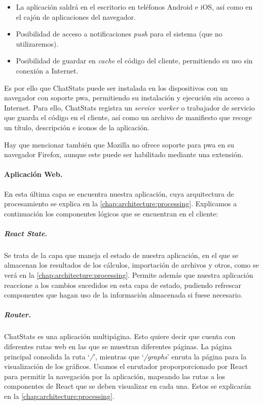 \begin{itemize}
	\item La aplicación saldrá en el escritorio en teléfonos Android e iOS, así como en el cajón de aplicaciones del navegador.
	\item Posibilidad de acceso a notificaciones \textit{push} para el sistema (que no utilizaremos).
	\item Posibilidad de guardar en \textit{cache} el código del cliente, permitiendo su uso sin conexión a Internet.
\end{itemize}

Es por ello que ChatStats puede ser instalada en los dispositivos con un navegador con soporte \acrshort{pwa}, permitiendo su instalación y ejecución sin acceso a Internet. Para ello, ChatStats registra un \textit{service worker} o trabajador de servicio que guarda el código en el cliente, así como un archivo de manifiesto que recoge un título, descripción e iconos de la aplicación.

Hay que mencionar también que Mozilla no ofrece soporte para \acrshort{pwa} en su navegador Firefox\cite{firefoxNoPWA}, aunque este puede ser habilitado mediante una extensión\cite{firefoxPWAextension}.

\paragraph{Aplicación Web.} En esta última capa se encuentra nuestra aplicación, cuya arquitectura de procesamiento se explica en la \autoref{chap:architecture:processing}. Explicamos a continuación los componentes lógicos que se encuentran en el cliente:

\subparagraph{React State.} Se trata de la capa que maneja el estado de nuestra aplicación, en el que se almacenan los resultados de los cálculos, importación de archivos y otros, como se verá en la \autoref{chap:architecture:processing}. Permite además que nuestra aplicación reaccione a los cambios sucedidos en esta capa de estado, pudiendo refrescar componentes que hagan uso de la información almacenada si fuese necesario.

\subparagraph{Router.} ChatStats es una aplicación multipágina. Esto quiere decir que cuenta con diferentes rutas web en las que se muestran diferentes páginas. La página principal consolida la ruta `\textit{/}', mientras que `\textit{/graphs}' enruta la página para la visualización de los gráficos. Usamos el enrutador proporporcionado por React para permitir la navegación por la aplicación, mapeando las rutas a los componentes de React que se deben visualizar en cada una. Estos se explicarán en la \autoref{chap:architecture:processing}.

